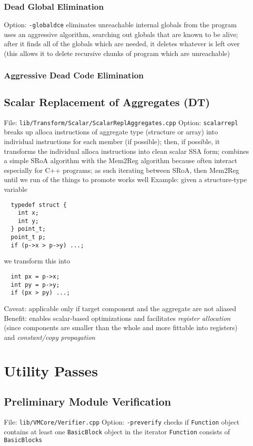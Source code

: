 \documentclass{myproc}
\begin{document}
\subsubsection{Dead Global Elimination}
\bit
\w Option: \verb+-globaldce+
\w  eliminates unreachable internal globals from the program
\w uses an aggressive algorithm, searching out globals that are known to be
alive; after it finds all of the globals which are needed, it deletes whatever is
left over (this allows it to delete recursive chunks of program which are
unreachable) 
\eit

\subsubsection{Aggressive Dead Code Elimination}

\subsection{Scalar Replacement of Aggregates (DT)}
\bit
\w File: \verb+lib/Transform/Scalar/ScalarReplAggregates.cpp+
\w Option: \verb+scalarrepl+
\w breaks up alloca instructions of aggregate type (structure or array) into
individual instructions for each member (if possible); then, if possible, it
transforms the individual alloca instructions into clean scalar SSA form;
combines a simple SRoA algorithm with the Mem2Reg algorithm because often
interact especially for C++ programs; as such iterating between SRoA, then
Mem2Reg until we run of the things to promote works well
\w Example: given a structure-type variable
\begin{verbatim}
  typedef struct { 
    int x;
    int y;
  } point_t;
  point_t p;
  if (p->x > p->y) ...;
\end{verbatim}
we transform this into
\begin{verbatim}
  int px = p->x;
  int py = p->y;
  if (px > py) ...;
\end{verbatim}
\w Caveat: applicable only if target component and the aggregate are not
aliased
\w Benefit:  enables scalar-based optimizations and facilitates {\em register
allocation\/} (since components are smaller than the whole and more fittable into
registers) and {\em constant/copy propagation\/}
\eit


\section{Utility Passes}
\subsection{Preliminary Module Verification}
\bit
\w File: \verb+lib/VMCore/Verifier.cpp+
\w Option: \verb+-preverify+
\w checks if \verb+Function+ object contains at least one \verb+BasicBlock+
object in the iterator
   \bit
   \w \verb+Function+ consists of \verb+BasicBlocks+
   \eit
\eit
\end{document}
